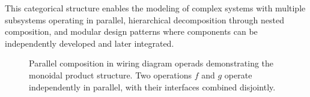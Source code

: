 This categorical structure enables the modeling of complex systems with multiple subsystems operating in parallel, hierarchical decomposition through nested composition, and modular design patterns where components can be independently developed and later integrated.

\begin{figure}[h]
\centering

\caption{Parallel composition in wiring diagram operads demonstrating the monoidal product structure. Two operations $f$ and $g$ operate independently in parallel, with their interfaces combined disjointly.}
\label{fig:wiring-diagram-parallel}
\end{figure}


